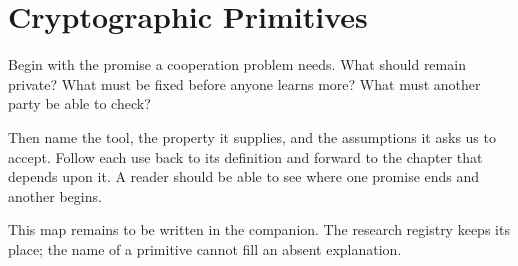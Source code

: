 \chapter{Cryptographic Primitives}
\label{short:primitives}

Begin with the promise a cooperation problem needs. What should remain
private? What must be fixed before anyone learns more? What must another
party be able to check?

Then name the tool, the property it supplies, and the assumptions it asks us
to accept. Follow each use back to its definition and forward to the chapter
that depends upon it. A reader should be able to see where one promise ends
and another begins.

This map remains to be written in the companion. The research registry keeps
its place; the name of a primitive cannot fill an absent explanation.

